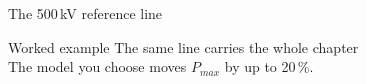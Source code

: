 %

\begin{frame}{The 500\,kV reference line}
  \begin{block}{Worked example}
    {The same line carries the whole chapter\\
    The model you choose moves $P_{max}$ by up to 20\,\%.}
  \end{block}


\end{frame}
